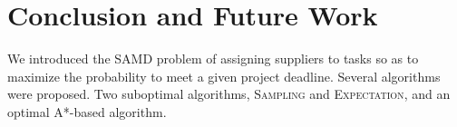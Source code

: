 \documentclass[letterpaper]{article} %
\newcommand{\samd}{\ac{SAMD}\xspace}
\newcommand{\astar}{\textsc{A*}\xspace}
\newcommand{\sampling}{\textsc{Sampling}\xspace}
\newcommand{\expectation}{\textsc{Expectation}\xspace}
\begin{document}


\section{Conclusion and Future Work}

We introduced the \samd problem of assigning suppliers to tasks so as to maximize the probability to meet a given project deadline. Several algorithms were proposed. Two suboptimal algorithms, \sampling and \expectation, and an optimal \astar-based algorithm. %
\end{document}

